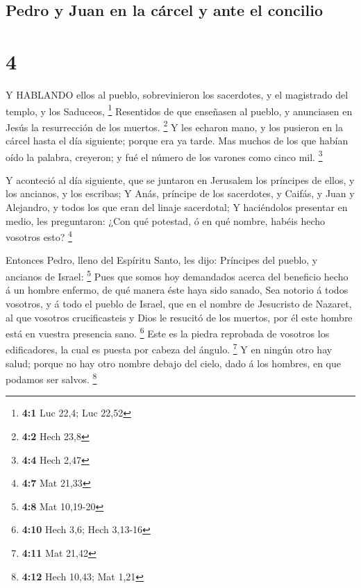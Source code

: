 \hypertarget{pedro-y-juan-en-la-cuxe1rcel-y-ante-el-concilio}{%
\subsection{Pedro y Juan en la cárcel y ante el
concilio}\label{pedro-y-juan-en-la-cuxe1rcel-y-ante-el-concilio}}

\hypertarget{section-3}{%
\section{4}\label{section-3}}

 Y HABLANDO ellos al pueblo, sobrevinieron los sacerdotes, y
el magistrado del templo, y los Saduceos, \footnote{\textbf{4:1} Luc
  22,4; Luc 22,52}  Resentidos de que enseñasen al pueblo, y
anunciasen en Jesús la resurrección de los muertos. \footnote{\textbf{4:2}
  Hech 23,8}  Y les echaron mano, y los pusieron en la
cárcel hasta el día siguiente; porque era ya tarde.  Mas
muchos de los que habían oído la palabra, creyeron; y fué el número de
los varones como cinco mil. \footnote{\textbf{4:4} Hech 2,47}

 Y aconteció al día siguiente, que se juntaron en Jerusalem
los príncipes de ellos, y los ancianos, y los escribas;  Y
Anás, príncipe de los sacerdotes, y Caifás, y Juan y Alejandro, y todos
los que eran del linaje sacerdotal;  Y haciéndolos presentar
en medio, les preguntaron: ¿Con qué potestad, ó en qué nombre, habéis
hecho vosotros esto? \footnote{\textbf{4:7} Mat 21,33}

 Entonces Pedro, lleno del Espíritu Santo, les dijo:
Príncipes del pueblo, y ancianos de Israel: \footnote{\textbf{4:8} Mat
  10,19-20}  Pues que somos hoy demandados acerca del
beneficio hecho á un hombre enfermo, de qué manera éste haya sido
sanado,  Sea notorio á todos vosotros, y á todo el pueblo
de Israel, que en el nombre de Jesucristo de Nazaret, al que vosotros
crucificasteis y Dios le resucitó de los muertos, por él este hombre
está en vuestra presencia sano. \footnote{\textbf{4:10} Hech 3,6; Hech
  3,13-16}  Este es la piedra reprobada de vosotros los
edificadores, la cual es puesta por cabeza del ángulo. \footnote{\textbf{4:11}
  Mat 21,42}  Y en ningún otro hay salud; porque no hay
otro nombre debajo del cielo, dado á los hombres, en que podamos ser
salvos. \footnote{\textbf{4:12} Hech 10,43; Mat 1,21}

